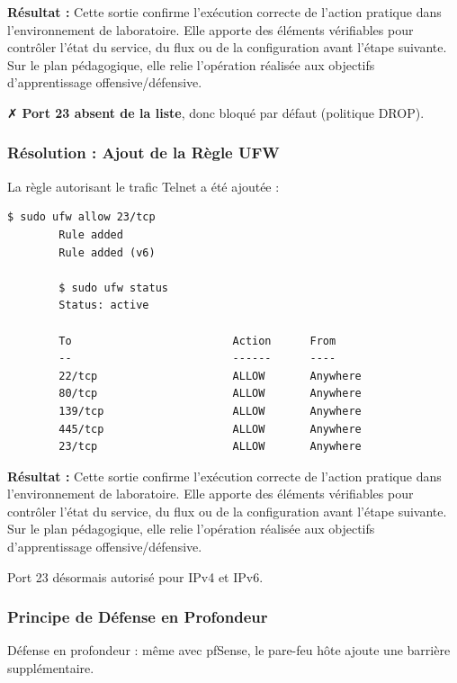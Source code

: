 \documentclass[12pt,a4paper,openany]{report}
\begin{document}
	\textbf{Résultat :} Cette sortie confirme l'exécution correcte de l'action pratique dans l'environnement de laboratoire. Elle apporte des éléments vérifiables pour contrôler l'état du service, du flux ou de la configuration avant l'étape suivante. Sur le plan pédagogique, elle relie l'opération réalisée aux objectifs d'apprentissage offensive/défensive.
	
	
	✗ \textbf{Port 23 absent de la liste}, donc bloqué par défaut (politique DROP).
	
	\subsubsection{Résolution : Ajout de la Règle UFW}
	La règle autorisant le trafic Telnet a été ajoutée :
	
	\begin{lstlisting}[caption=Autorisation du port 23 dans UFW]
		$ sudo ufw allow 23/tcp
		Rule added
		Rule added (v6)
		
		$ sudo ufw status
		Status: active
		
		To                         Action      From
		--                         ------      ----
		22/tcp                     ALLOW       Anywhere
		80/tcp                     ALLOW       Anywhere
		139/tcp                    ALLOW       Anywhere
		445/tcp                    ALLOW       Anywhere
		23/tcp                     ALLOW       Anywhere
	\end{lstlisting}
	
	\textbf{Résultat :} Cette sortie confirme l'exécution correcte de l'action pratique dans l'environnement de laboratoire. Elle apporte des éléments vérifiables pour contrôler l'état du service, du flux ou de la configuration avant l'étape suivante. Sur le plan pédagogique, elle relie l'opération réalisée aux objectifs d'apprentissage offensive/défensive.
	
	
	\textcolor{green}{\checkmark} Port 23 désormais autorisé pour IPv4 et IPv6.
	
	\subsubsection{Principe de Défense en Profondeur}
	Défense en profondeur : même avec pfSense, le pare-feu hôte ajoute une barrière supplémentaire.
	
\end{document}
